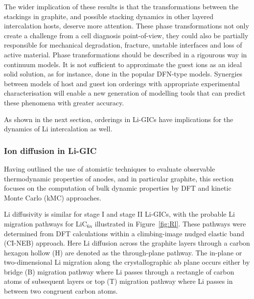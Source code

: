 \documentclass[../main.tex]{subfiles}
\begin{document}
The wider implication of these results is that the transformations between the stackings in graphite, and possible stacking dynamics in other layered intercalation hosts, deserve more attention. These phase transformations not only create a challenge from a cell diagnosis point-of-view, they could also be partially responsible for mechanical degradation, fracture, unstable interfaces and loss of active material. Phase transformations should be described in a rigourous way in continuum models. It is not sufficient to approximate the guest ions as an ideal solid solution, as for instance, done in the popular DFN-type models. Synergies between models of host and guest ion orderings with appropriate experimental characterisation will enable a new generation of modelling tools that can predict these phenomena with greater accuracy. 

As shown in the next section, orderings in Li-GICs have implications for the dynamics of Li intercalation as well.

\subsubsection{Ion diffusion in Li-GIC} 
\label{sec:anodes_ion_diffusion}

Having outlined the use of atomistic techniques to evaluate observable thermodynamic properties of anodes, and in particular graphite, this section focuses on the computation of bulk dynamic properties by DFT and kinetic Monte Carlo (kMC) approaches.   

Li diffusivity is similar for stage I and stage II Li-GICs, \cite{persson2010} with the probable Li migration pathways for LiC$_{6n}$ illustrated in Figure~\ref{fig:Rl}.  \cite{thinius2014theoretical} These pathways were determined from DFT calculations within a climbing-image nudged elastic band (CI-NEB) approach. Here Li diffusion across the graphite layers through a carbon hexagon hollow (H) are denoted as the through-plane pathway. The in-plane or two-dimensional Li migration along the crystallographic ab plane occurs either by bridge (B) migration pathway where Li passes through a rectangle of carbon atoms of subsequent layers or top (T) migration pathway where Li passes in between two congruent carbon atoms.   
\end{document}
